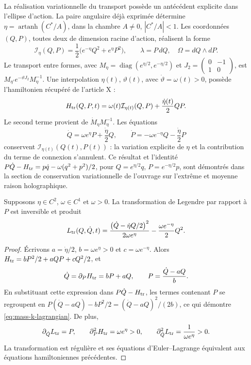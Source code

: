 La réalisation variationnelle du transport possède un antécédent explicite dans l'ellipse d'action. La paire angulaire déjà exprimée détermine \(\eta=\operatorname{artanh}(C^*/A)\), dans la chambre \(A\ne0\), \(|C^*/A|<1\). Les coordonnées \((Q,P)\), toutes deux de dimension racine d'action, réalisent la forme
\[
 \mathcal I_\eta(Q,P)=\frac12\bigl(e^{-\eta}Q^2+e^\eta P^2\bigr),
 \qquad \lambda=P\,dQ,\quad \Omega=dQ\wedge dP.
\]
Le transport entre formes, avec \(M_\eta=\operatorname{diag}(e^{\eta/2},e^{-\eta/2})\) et \(J_2=\left(\begin{smallmatrix}0&-1\\1&0\end{smallmatrix}\right)\), est \(M_{\eta'}e^{-\vartheta J_2}M_\eta^{-1}\). Une interpolation \(\eta(t)\), \(\vartheta(t)\), avec \(\dot\vartheta=\omega(t)>0\), possède l'hamiltonien récupéré de l'article X :
\begin{equation}
 H_{\rm tr}(Q,P,t)=\omega(t)\mathcal I_{\eta(t)}(Q,P)
                 +\frac{\dot\eta(t)}2QP.
 \label{eq:mass-k-hamiltonian}
\end{equation}
Le second terme provient de \(\dot M_\eta M_\eta^{-1}\). Les équations
\[
 \dot Q=\omega e^\eta P+\frac{\dot\eta}2Q,
 \qquad
 \dot P=-\omega e^{-\eta}Q-\frac{\dot\eta}2P
\]
conservent \(\mathcal I_{\eta(t)}(Q(t),P(t))\) : la variation explicite de \(\eta\) et la contribution du terme de connexion s'annulent. Ce résultat et l'identité \(P\dot Q-H_{\rm tr}=p\dot q-\omega(q^2+p^2)/2\), pour \(Q=e^{\eta/2}q\), \(P=e^{-\eta/2}p\), sont démontrés dans la section de conservation variationnelle de l'ouvrage sur l'extrême et moyenne raison holographique.

\begin{proposition}
Supposons \(\eta\in C^2\), \(\omega\in C^1\) et \(\omega>0\).
La transformation de Legendre par rapport à \(P\) est inversible et
produit
\begin{equation}
 L_{\rm tr}(Q,\dot Q,t)=
 \frac{\bigl(\dot Q-\dot\eta Q/2\bigr)^2}{2\omega e^\eta}
 -\frac{\omega e^{-\eta}}2Q^2.
 \label{eq:mass-k-lagrangian}
\end{equation}
\end{proposition}
\begin{proof}
Écrivons \(a=\dot\eta/2\), \(b=\omega e^\eta>0\) et
\(c=\omega e^{-\eta}\). Alors
\(H_{\rm tr}=bP^2/2+aQP+cQ^2/2\), et
\[
 \dot Q=\partial_PH_{\rm tr}=bP+aQ,
 \qquad P=\frac{\dot Q-aQ}{b}.
\]
En substituant cette expression dans \(P\dot Q-H_{\rm tr}\), les
termes contenant \(P\) se regroupent en
\(P(\dot Q-aQ)-bP^2/2=(\dot Q-aQ)^2/(2b)\), ce qui
démontre \eqref{eq:mass-k-lagrangian}. De plus,
\[
 \partial_{\dot Q}L_{\rm tr}=P,
 \qquad
 \partial_P^2H_{\rm tr}=\omega e^\eta>0,
 \qquad
 \partial_{\dot Q}^2L_{\rm tr}=\frac1{\omega e^\eta}>0.
\]
La transformation est régulière et ses équations d’Euler--Lagrange
équivalent aux équations hamiltoniennes précédentes.
\end{proof}

